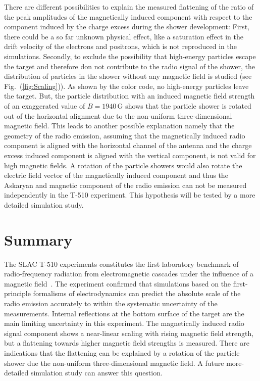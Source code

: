 \documentclass[epj]{webofc}
\newcommand*{\figref}[1]{Fig.~(\ref{fig:#1})}
\begin{document}
There are different possibilities to explain the measured flattening of the ratio of the peak amplitudes of the magnetically induced component with respect to the component induced by the charge excess during the shower development: 
First, there could be a so far unknown physical effect, like a saturation effect in the drift velocity of the electrons and positrons, which is not reproduced in the simulations. 
Secondly, to exclude the possibility that high-energy particles escape the target and therefore don not contribute to the radio signal of the shower, the distribution of particles in the shower without any magnetic field is studied (see \figref{Scaling}). As shown by the color code, no high-energy particles leave the target. 
But, the particle distribution with an induced magnetic field strength of an exaggerated value of $B=1940\,\mbox{G}$ shows that the particle shower is rotated out of the horizontal alignment due to the non-uniform three-dimensional magnetic field. 
This leads to another possible explanation namely that the geometry of the radio emission, assuming that the magnetically induced radio component is aligned with the horizontal channel of the antenna and the charge excess induced component is aligned with the vertical component, is not valid for high magnetic fields. A rotation of the particle showers would also rotate the electric field vector of the magnetically induced component and thus the Askaryan and magnetic component of the radio emission can not be measured independently in the T-510 experiment. This hypothesis will be tested by a more detailed simulation study.



\section{Summary}
\vspace{-0.15cm}
The SLAC T-510 experiments constitutes the first laboratory benchmark of radio-frequency radiation from electromagnetic cascades under the influence of a magnetic field~\cite{PRL}.
The experiment confirmed that simulations based on the first-principle formalisms of electrodynamics can predict the absolute scale of the radio emission accurately to within the systematic uncertainty of the measurements. Internal reflections at the bottom surface of the target are the main limiting uncertainty in this experiment.
The magnetically induced radio signal component shows a near-linear scaling with rising magnetic field strength, but a flattening towards higher magnetic field strengths is measured. There are  indications that the flattening can be explained by a rotation of the particle shower due the non-uniform three-dimensional magnetic field. A future more-detailed simulation study can answer this question.
\end{document}
